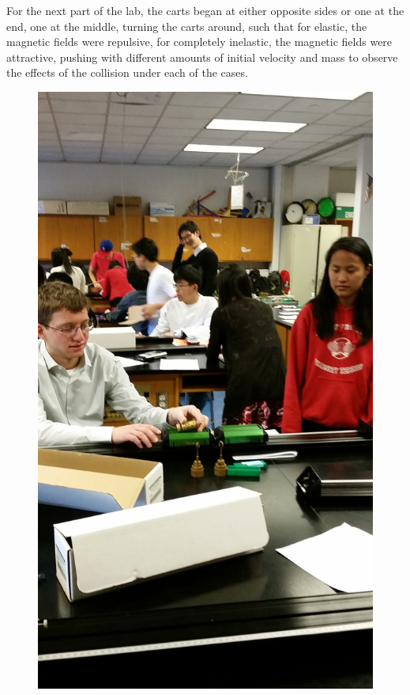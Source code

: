 \documentclass[11pt, titlepage]{article}
\begin{document}
For the next part of the lab, the carts began at either opposite sides or one at the end, one at the middle, turning the carts around, such that for elastic, the magnetic fields were repulsive, for completely inelastic, the magnetic fields were attractive, pushing with different amounts of initial velocity and mass to observe the effects of the collision under each of the cases.

\begin{figure}[p]
\centering
\hspace*{-10.5cm}
\includegraphics[scale=0.15, angle=270]{lab6.jpg}
\vspace*{19cm}
\end{figure}
\end{document}
